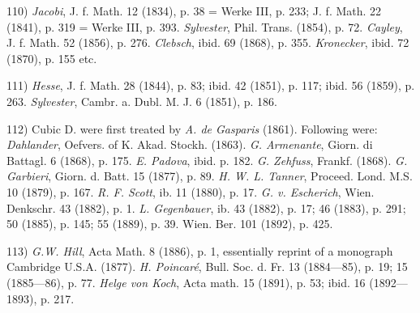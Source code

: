 \vfill
\leftline{\rule{2in}{0.4pt}}
\vspace{0.2cm}
{
\footnotesize
110) \textit{Jacobi}, J. f. Math. 12 (1834), p. 38 = Werke III, p. 233; J. f. Math. 22 (1841), p. 319 = Werke III, p. 393. \textit{Sylvester}, Phil. Trans. (1854), p. 72. \textit{Cayley}, J. f. Math. 52 (1856), p. 276. \textit{Clebsch}, ibid. 69 (1868), p. 355. \textit{Kronecker}, ibid. 72 (1870), p. 155 etc.

111) \textit{Hesse}, J. f. Math. 28 (1844), p. 83; ibid. 42 (1851), p. 117; ibid. 56 (1859), p. 263. \textit{Sylvester}, Cambr. a. Dubl. M. J. 6 (1851), p. 186.

112) Cubic D. were first treated by \textit{A. de Gasparis} (1861). Following were: \textit{Dahlander}, Oefvers. of K. Akad. Stockh. (1863). \textit{G. Armenante}, Giorn. di Battagl. 6 (1868), p. 175. \textit{E. Padova}, ibid. p. 182. \textit{G. Zehfuss}, Frankf. (1868). \textit{G. Garbieri}, Giorn. d. Batt. 15 (1877), p. 89. \textit{H. W. L. Tanner}, Proceed. Lond. M.S. 10 (1879), p. 167. \textit{R. F. Scott}, ib. 11 (1880), p. 17. \textit{G. v. Escherich}, Wien. Denkschr. 43 (1882), p. 1. \textit{L. Gegenbauer}, ib. 43 (1882), p. 17; 46 (1883), p. 291; 50 (1885), p. 145; 55 (1889), p. 39. Wien. Ber. 101 (1892), p. 425.

113) \textit{G.W. Hill}, Acta Math. 8 (1886), p. 1, essentially reprint of a monograph Cambridge U.S.A. (1877). \textit{H. Poincaré}, Bull. Soc. d. Fr. 13 (1884—85), p. 19; 15 (1885—86), p. 77. \textit{Helge von Koch}, Acta math. 15 (1891), p. 53; ibid. 16 (1892—1893), p. 217.

}
